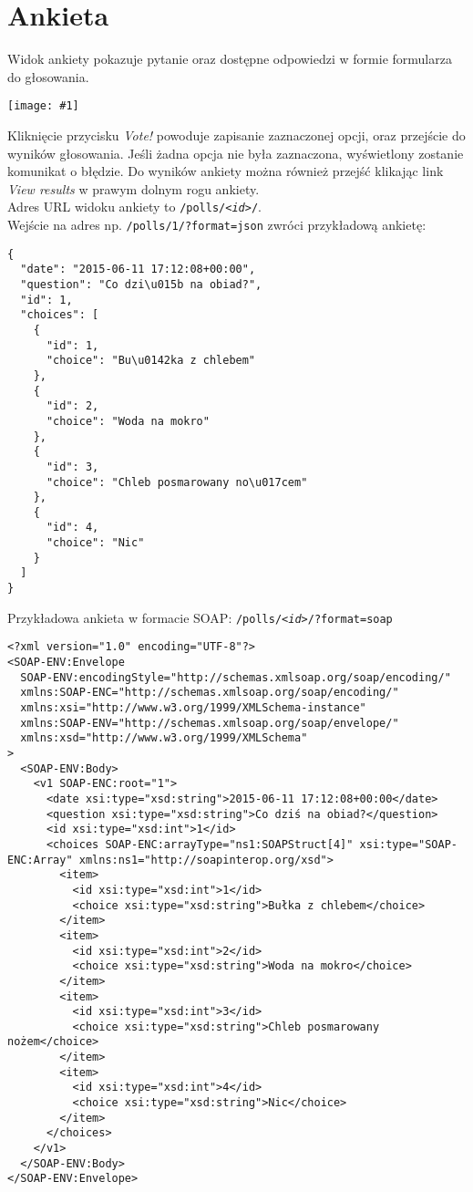 \documentclass[12pt,a4paper]{article}
\newcommand{\screenshot}[1]{\\\begin{minipage}[c]{\textwidth}\hspace{0em}\texttt{[image: \#1]}\end{minipage}\vspace{0em}}
\newcommand{\json}[1]{\texttt{#1?format=json}}
\newcommand{\soap}[1]{\texttt{#1?format=soap}}
\begin{document}
\section{Ankieta}
Widok ankiety pokazuje pytanie oraz dostępne odpowiedzi w formie formularza do głosowania.
\screenshot{poll.png}
Kliknięcie przycisku \emph{Vote!} powoduje zapisanie zaznaczonej opcji, oraz przejście do wyników głosowania. Jeśli żadna opcja nie była zaznaczona, wyświetlony zostanie komunikat o błędzie. Do wyników ankiety można również przejść klikając link \emph{View results} w prawym dolnym rogu ankiety.\\
Adres URL widoku ankiety to \texttt{/polls/\emph{<id>}/}.\\
Wejście na adres np. \json{/polls/1/} zwróci przykładową ankietę:
\begin{verbatim}
{
  "date": "2015-06-11 17:12:08+00:00",
  "question": "Co dzi\u015b na obiad?",
  "id": 1,
  "choices": [
    {
      "id": 1,
      "choice": "Bu\u0142ka z chlebem"
    },
    {
      "id": 2,
      "choice": "Woda na mokro"
    },
    {
      "id": 3,
      "choice": "Chleb posmarowany no\u017cem"
    },
    {
      "id": 4,
      "choice": "Nic"
    }
  ]
}
\end{verbatim}
Przykładowa ankieta w formacie SOAP: \soap{/polls/\emph{<id>}/}
\begin{verbatim}
<?xml version="1.0" encoding="UTF-8"?>
<SOAP-ENV:Envelope
  SOAP-ENV:encodingStyle="http://schemas.xmlsoap.org/soap/encoding/"
  xmlns:SOAP-ENC="http://schemas.xmlsoap.org/soap/encoding/"
  xmlns:xsi="http://www.w3.org/1999/XMLSchema-instance"
  xmlns:SOAP-ENV="http://schemas.xmlsoap.org/soap/envelope/"
  xmlns:xsd="http://www.w3.org/1999/XMLSchema"
>
  <SOAP-ENV:Body>
    <v1 SOAP-ENC:root="1">
      <date xsi:type="xsd:string">2015-06-11 17:12:08+00:00</date>
      <question xsi:type="xsd:string">Co dziś na obiad?</question>
      <id xsi:type="xsd:int">1</id>
      <choices SOAP-ENC:arrayType="ns1:SOAPStruct[4]" xsi:type="SOAP-ENC:Array" xmlns:ns1="http://soapinterop.org/xsd">
        <item>
          <id xsi:type="xsd:int">1</id>
          <choice xsi:type="xsd:string">Bułka z chlebem</choice>
        </item>
        <item>
          <id xsi:type="xsd:int">2</id>
          <choice xsi:type="xsd:string">Woda na mokro</choice>
        </item>
        <item>
          <id xsi:type="xsd:int">3</id>
          <choice xsi:type="xsd:string">Chleb posmarowany nożem</choice>
        </item>
        <item>
          <id xsi:type="xsd:int">4</id>
          <choice xsi:type="xsd:string">Nic</choice>
        </item>
      </choices>
    </v1>
  </SOAP-ENV:Body>
</SOAP-ENV:Envelope>
\end{verbatim}
\end{document}
